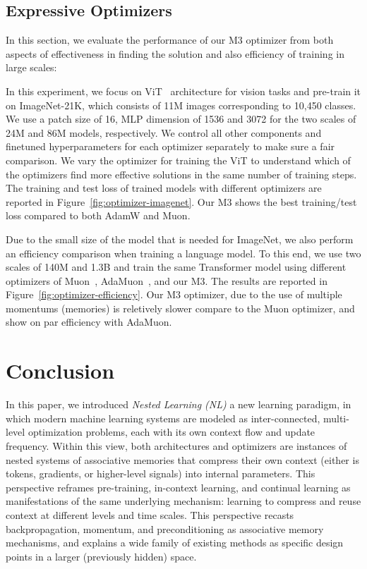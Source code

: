\documentclass{article}
\newcommand{\citep}{\parencite}
\newcommand{\head}[1]{\vspace{1.7mm}\noindent{{\textcolor{c4}{\bf #1.}}}}
\begin{document}
{\subsection{Expressive Optimizers}\label{sec:exp-deep-optimizer}
In this section, we evaluate the performance of our M3 optimizer from both aspects of effectiveness in finding the solution and also efficiency of training in large scales:

\head{ImageNet} In this experiment, we focus on ViT~\citep{dosovitskiy2021an} architecture for vision tasks and pre-train it on ImageNet-21K, which consists of 11M images corresponding to 10,450 classes. We use a patch size of 16, MLP dimension of 1536 and 3072 for the two scales of 24M and 86M models, respectively. We control all other components and finetuned hyperparameters for each optimizer separately to make sure a fair comparison. We vary the optimizer for training the ViT to understand which of the optimizers find more effective solutions in the same number of training steps. The training and test loss of trained models with different optimizers are reported in Figure~\ref{fig:optimizer-imagenet}. Our M3 shows the best training/test loss compared to both AdamW and Muon. 

\head{Efficiency in Large Models} Due to the small size of the model that is needed for ImageNet, we also perform an efficiency comparison when training a language model. To this end, we use two scales of 140M and 1.3B and train the same Transformer model using different optimizers of Muon~\citep{jordanmuon}, AdaMuon~\citep{si2025adamuon}, and our M3. The results are reported in Figure~\ref{fig:optimizer-efficiency}. Our M3 optimizer, due to the use of multiple momentums (memories) is reletively slower compare to the Muon optimizer, and show on par efficiency with AdaMuon.  

\section{Conclusion}\label{sec:concolusion}
In this paper, we introduced \emph{Nested Learning (NL)} a new learning paradigm, in which modern machine learning systems are modeled as inter-connected, multi-level optimization problems, each with its own context flow and update frequency. Within this view, both architectures and optimizers are instances of nested systems of associative memories that compress their own context (either is tokens, gradients, or higher-level signals) into internal parameters. This perspective reframes pre-training, in-context learning, and continual learning as manifestations of the same underlying mechanism: learning to compress and reuse context at different levels and time scales. This perspective recasts backpropagation, momentum, and preconditioning as associative memory mechanisms, and explains a wide family of existing methods as specific design points in a larger (previously hidden) space.

}
\end{document}
